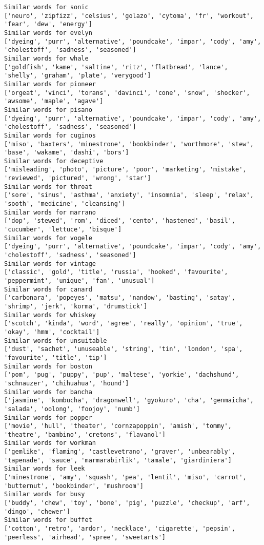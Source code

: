 \documentclass[11pt]{article}
\begin{document}
\begin{Verbatim}[commandchars=\\\{\}]
Similar words for sonic
['neuro', 'zipfizz', 'celsius', 'golazo', 'cytoma', 'fr', 'workout', 'fear', 'dew', 'energy']
Similar words for evelyn
['dyeing', 'purr', 'alternative', 'poundcake', 'impar', 'cody', 'amy', 'cholestoff', 'sadness', 'seasoned']
Similar words for whale
['goldfish', 'kame', 'saltine', 'ritz', 'flatbread', 'lance', 'shelly', 'graham', 'plate', 'verygood']
Similar words for pioneer
['orgeat', 'vinci', 'torans', 'davinci', 'cone', 'snow', 'shocker', 'awsome', 'maple', 'agave']
Similar words for pisano
['dyeing', 'purr', 'alternative', 'poundcake', 'impar', 'cody', 'amy', 'cholestoff', 'sadness', 'seasoned']
Similar words for cuginos
['miso', 'baxters', 'minestrone', 'bookbinder', 'worthmore', 'stew', 'base', 'wakame', 'dashi', 'bors']
Similar words for deceptive
['misleading', 'photo', 'picture', 'poor', 'marketing', 'mistake', 'reviewed', 'pictured', 'wrong', 'star']
Similar words for throat
['sore', 'sinus', 'asthma', 'anxiety', 'insomnia', 'sleep', 'relax', 'sooth', 'medicine', 'cleansing']
Similar words for marrano
['dop', 'stewed', 'rom', 'diced', 'cento', 'hastened', 'basil', 'cucumber', 'lettuce', 'bisque']
Similar words for vogele
['dyeing', 'purr', 'alternative', 'poundcake', 'impar', 'cody', 'amy', 'cholestoff', 'sadness', 'seasoned']
Similar words for vintage
['classic', 'gold', 'title', 'russia', 'hooked', 'favourite', 'peppermint', 'unique', 'fan', 'unusual']
Similar words for canard
['carbonara', 'popeyes', 'matsu', 'nandow', 'basting', 'satay', 'shrimp', 'jerk', 'korma', 'drumstick']
Similar words for whiskey
['scotch', 'kinda', 'word', 'agree', 'really', 'opinion', 'true', 'okay', 'hmm', 'cocktail']
Similar words for unsuitable
['dust', 'sachet', 'unuseable', 'string', 'tin', 'london', 'spa', 'favourite', 'title', 'tip']
Similar words for boston
['pom', 'pug', 'puppy', 'pup', 'maltese', 'yorkie', 'dachshund', 'schnauzer', 'chihuahua', 'hound']
Similar words for bancha
['jasmine', 'kombucha', 'dragonwell', 'gyokuro', 'cha', 'genmaicha', 'salada', 'oolong', 'foojoy', 'numb']
Similar words for popper
['movie', 'hull', 'theater', 'cornzapoppin', 'amish', 'tommy', 'theatre', 'bambino', 'cretons', 'flavanol']
Similar words for workman
['gemlike', 'flaming', 'castlevetrano', 'graver', 'unbearably', 'tapenade', 'sauce', 'marmarabirlik', 'tamale', 'giardiniera']
Similar words for leek
['minestrone', 'amy', 'squash', 'pea', 'lentil', 'miso', 'carrot', 'butternut', 'bookbinder', 'mushroom']
Similar words for busy
['buddy', 'chew', 'toy', 'bone', 'pig', 'puzzle', 'checkup', 'arf', 'dingo', 'chewer']
Similar words for buffet
['cotton', 'retro', 'ardor', 'necklace', 'cigarette', 'pepsin', 'peerless', 'airhead', 'spree', 'sweetarts']

\end{Verbatim}
\end{document}
